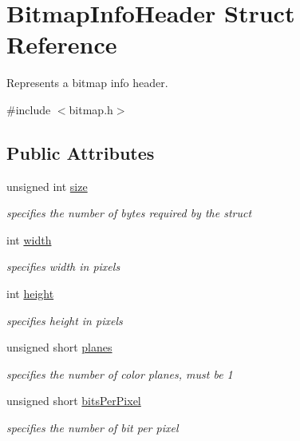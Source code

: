 \hypertarget{struct_bitmap_info_header}{}\section{Bitmap\+Info\+Header Struct Reference}
\label{struct_bitmap_info_header}


Represents a bitmap info header.  




{\ttfamily \#include $<$bitmap.\+h$>$}

\subsection*{Public Attributes}
\begin{DoxyCompactItemize}
\item 
unsigned int \mbox{\hyperlink{group__bitmap_ga411fa70f6547a0360b33edcd3273d169}{size}}
\begin{DoxyCompactList}\small\item\em specifies the number of bytes required by the struct \end{DoxyCompactList}\item 
int \mbox{\hyperlink{group__bitmap_gac2034cfbada460819beed1ee24581c5d}{width}}
\begin{DoxyCompactList}\small\item\em specifies width in pixels \end{DoxyCompactList}\item 
int \mbox{\hyperlink{group__bitmap_gaaa1d31efc13210020a38d435e4961df9}{height}}
\begin{DoxyCompactList}\small\item\em specifies height in pixels \end{DoxyCompactList}\item 
unsigned short \mbox{\hyperlink{group__bitmap_ga9925e97e8bbc6b797afe2d22fbab45d6}{planes}}
\begin{DoxyCompactList}\small\item\em specifies the number of color planes, must be 1 \end{DoxyCompactList}\item 
unsigned short \mbox{\hyperlink{group__bitmap_ga2a1eb136325c8cb16aeeb7108703702f}{bits\+Per\+Pixel}}
\begin{DoxyCompactList}\small\item\em specifies the number of bit per pixel \end{DoxyCompactList}\item 

\end{DoxyCompactItemize}
